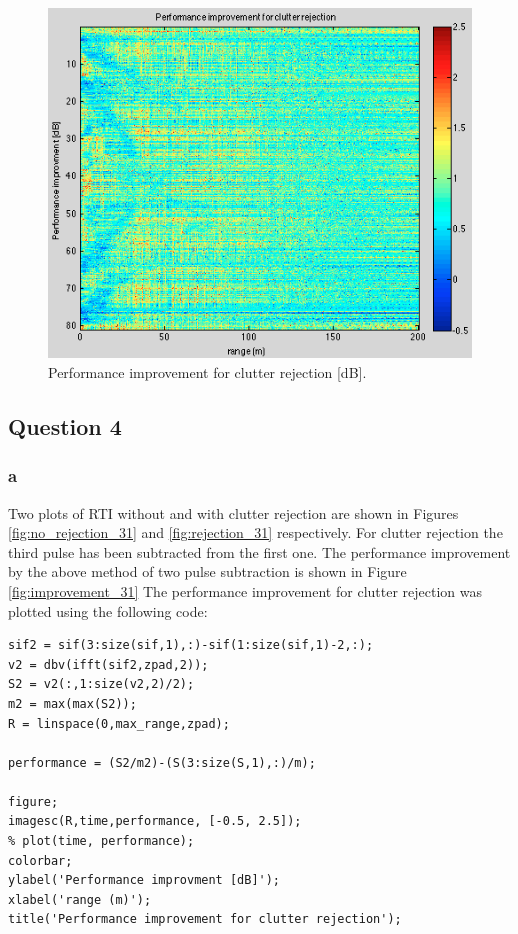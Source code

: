 \documentclass{article}
\begin{document}
\begin{figure}[ht]
\begin{minipage}[b]{0.33\linewidth}
\end{minipage}
\begin{minipage}[b]{0.33\linewidth}
\centering
\includegraphics[width=\textwidth]{Figures/improvement.png}
\caption{Performance improvement for clutter rejection [dB].}
\label{fig:improvement}
\end{minipage}
\end{figure}


\subsection{Question 4}
\subsubsection{a}

Two plots of RTI without and with clutter rejection are shown in Figures \ref{fig:no_rejection_31} and \ref{fig:rejection_31} respectively. For clutter rejection the third pulse has been subtracted from the first one. The performance improvement by the above method of two pulse subtraction is shown in Figure \ref{fig:improvement_31}
The performance improvement for clutter rejection was plotted using the following code:
\begin{lstlisting}
sif2 = sif(3:size(sif,1),:)-sif(1:size(sif,1)-2,:);
v2 = dbv(ifft(sif2,zpad,2));
S2 = v2(:,1:size(v2,2)/2);
m2 = max(max(S2));
R = linspace(0,max_range,zpad);

performance = (S2/m2)-(S(3:size(S,1),:)/m);

figure;
imagesc(R,time,performance, [-0.5, 2.5]);
% plot(time, performance);
colorbar;
ylabel('Performance improvment [dB]');
xlabel('range (m)');
title('Performance improvement for clutter rejection');
\end{lstlisting}
\end{document}
